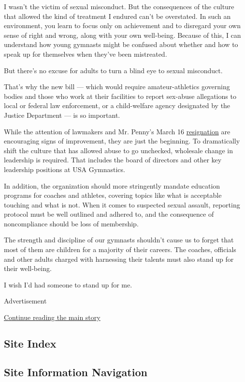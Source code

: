 I wasn't the victim of sexual misconduct. But the consequences of the
culture that allowed the kind of treatment I endured can't be
overstated. In such an environment, you learn to focus only on
achievement and to disregard your own sense of right and wrong, along
with your own well-being. Because of this, I can understand how young
gymnasts might be confused about whether and how to speak up for
themselves when they've been mistreated.

But there's no excuse for adults to turn a blind eye to sexual
misconduct.

That's why the new bill --- which would require amateur-athletics
governing bodies and those who work at their facilities to report
sex-abuse allegations to local or federal law enforcement, or a
child-welfare agency designated by the Justice Department --- is so
important.

While the attention of lawmakers and Mr. Penny's March 16
\href{https://www.nytimes.com/2017/03/16/sports/steve-penny-resigns-as-usa-gymnastics-president.html}{resignation}
are encouraging signs of improvement, they are just the beginning. To
dramatically shift the culture that has allowed abuse to go unchecked,
wholesale change in leadership is required. That includes the board of
directors and other key leadership positions at USA Gymnastics.

In addition, the organization should more stringently mandate education
programs for coaches and athletes, covering topics like what is
acceptable touching and what is not. When it comes to suspected sexual
assault, reporting protocol must be well outlined and adhered to, and
the consequence of noncompliance should be loss of membership.

The strength and discipline of our gymnasts shouldn't cause us to forget
that most of them are children for a majority of their careers. The
coaches, officials and other adults charged with harnessing their
talents must also stand up for their well-being.

I wish I'd had someone to stand up for me.

Advertisement

\protect\hyperlink{after-bottom}{Continue reading the main story}

\hypertarget{site-index}{%
\subsection{Site Index}\label{site-index}}

\hypertarget{site-information-navigation}{%
\subsection{Site Information
Navigation}\label{site-information-navigation}}


